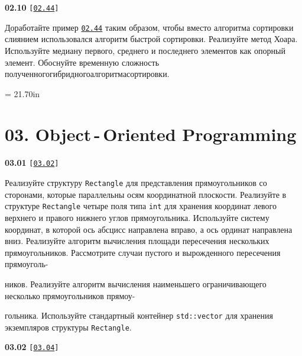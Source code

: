 \documentclass[a4paper,12pt]{article}
\begin{document}
\bigskip

{\large \textbf{02.10} \texttt{[\href{https://github.com/i-s-m-mipt/Education/blob/master/projects/examples/source/02.44.cpp}{\texttt{02.44}}]}}

\bigskip

Доработайте пример \href{https://github.com/i-s-m-mipt/Education/blob/master/projects/examples/source/02.44.cpp}{\texttt{02.44}} таким образом, чтобы вместо алгоритма сортировки слиянием использовался алгоритм быстрой сортировки. Реализуйте метод Хоара. Используйте медиану первого, среднего и последнего элементов как опорный элемент. Обоснуйте временную сложность полученного\;гибридного\;алгоритма\;сортировки.



\newpage\thispagestyle{empty}\pdfpageheight = 21.70in\enlargethispage{100in}

\section{03. Object\,-\,Oriented Programming}

{\large \textbf{03.01} \texttt{[\href{https://github.com/i-s-m-mipt/Education/blob/master/projects/examples/source/03.02.cpp}{\texttt{03.02}}]}}

\bigskip

Реализуйте структуру \lstinline{Rectangle} для представления прямоугольников со сторонами, которые параллельны осям координатной плоскости. Реализуйте в структуре \lstinline{Rectangle} четыре поля типа \lstinline{int} для хранения координат левого верхнего и правого нижнего углов прямоугольника. Используйте систему координат, в которой ось абсцисс направлена вправо, а ось ординат направлена вниз. Реализуйте алгоритм вычисления площади пересечения нескольких прямоугольников. Рассмотрите случаи пустого и вырожденного пересечения прямоуголь- 

ников. Реализуйте алгоритм вычисления наименьшего ограничивающего несколько прямоугольников прямоу-

гольника. Используйте стандартный контейнер \lstinline{std::vector} для хранения экземпляров структуры \lstinline{Rectangle}.

\bigskip

{\large \textbf{03.02} \texttt{[\href{https://github.com/i-s-m-mipt/Education/blob/master/projects/examples/source/03.04.cpp}{\texttt{03.04}}]}}

\bigskip
\end{document}
